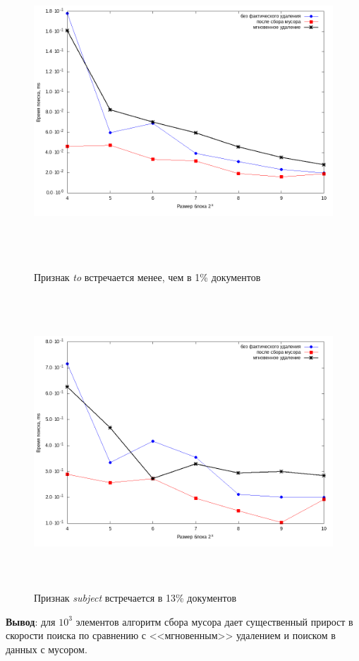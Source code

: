 \begin{figure}[H]
\includegraphics[width=\linewidth, height=11cm]{fig/limit_1e6/1e3/to.png}
\caption{Признак \textit{to} встречается менее, чем в 1\% документов}
\includegraphics[width=\linewidth, height=11cm]{fig/limit_1e6/1e3/subject.png}
\caption{Признак \textit{subject} встречается в 13\% документов}
\end{figure}

\textbf{Вывод}: для $10^3$ элементов алгоритм сбора мусора дает существенный
прирост в скорости поиска по сравнению с <<мгновенным>> удалением и поиском в данных с мусором.

